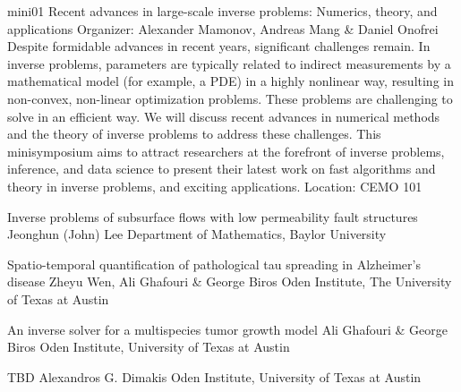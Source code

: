 \mini
{mini01}
{Recent advances in large-scale inverse problems: Numerics, theory, and applications}
{Organizer: Alexander Mamonov, Andreas Mang \& Daniel Onofrei}
{Despite formidable advances in recent years, significant challenges remain. In inverse problems, parameters are typically related to indirect measurements by a mathematical model (for example, a PDE) in a highly nonlinear way, resulting in non-convex, non-linear optimization problems. These problems are challenging to solve in an efficient way. We will discuss recent advances in numerical methods and the theory of inverse problems to address these challenges. This minisymposium aims to attract researchers at the forefront of inverse problems, inference, and data science to present their latest work on fast algorithms and theory in inverse problems, and exciting applications.}
{Location: CEMO 101}


\begin{talks}
\item\talk
{Inverse problems of subsurface flows with low permeability fault structures}
{Jeonghun (John) Lee}
{Department of Mathematics, Baylor University}
\item\talk
{Spatio-temporal quantification of pathological tau spreading in Alzheimer's disease}
{Zheyu Wen, Ali Ghafouri \& George Biros}
{Oden Institute, The University of Texas at Austin}
\item\talk
{An inverse solver for a multispecies tumor growth model}
{Ali Ghafouri \& George Biros}
{Oden Institute, University of Texas at Austin}
\item\talk
{TBD}
{Alexandros G. Dimakis}
{Oden Institute, University of Texas at Austin}
\end{talks}

\room

